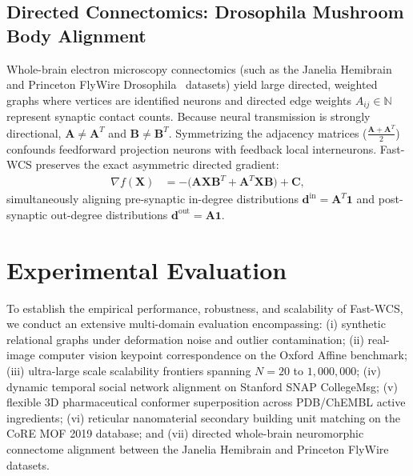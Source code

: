 \documentclass[a4paper,fleqn]{cas-dc}
\theoremstyle{thmstyleone}
\theoremstyle{thmstyletwo}
\theoremstyle{thmstylethree}
\begin{document}
\subsection{Directed Connectomics: Drosophila Mushroom Body Alignment}
Whole-brain electron microscopy connectomics (such as the Janelia Hemibrain~\cite{scheffer2020} and Princeton FlyWire Drosophila~\cite{dorkenwald2024} datasets) yield large directed, weighted graphs where vertices are identified neurons and directed edge weights $A_{ij} \in \mathbb{N}$ represent synaptic contact counts. Because neural transmission is strongly directional, $\mathbf{A} \ne \mathbf{A}^T$ and $\mathbf{B} \ne \mathbf{B}^T$. Symmetrizing the adjacency matrices ($\frac{\mathbf{A}+\mathbf{A}^T}{2}$) confounds feedforward projection neurons with feedback local interneurons. Fast-WCS preserves the exact asymmetric directed gradient:
\begin{align}
\nabla f(\mathbf{X}) &= -\big(\mathbf{A}\mathbf{X}\mathbf{B}^T + \mathbf{A}^T\mathbf{X}\mathbf{B}\big) + \mathbf{C},
\label{eq:asymm_grad}
\end{align}
simultaneously aligning pre-synaptic in-degree distributions $\mathbf{d}^{\text{in}} = \mathbf{A}^T \mathbf{1}$ and post-synaptic out-degree distributions $\mathbf{d}^{\text{out}} = \mathbf{A}\mathbf{1}$.

\section{Experimental Evaluation}
\label{sec:experiments}

To establish the empirical performance, robustness, and scalability of Fast-WCS, we conduct an extensive multi-domain evaluation encompassing: (i) synthetic relational graphs under deformation noise and outlier contamination; (ii) real-image computer vision keypoint correspondence on the Oxford Affine benchmark; (iii) ultra-large scale scalability frontiers spanning $N = 20$ to $1{,}000{,}000$; (iv) dynamic temporal social network alignment on Stanford SNAP CollegeMsg; (v) flexible 3D pharmaceutical conformer superposition across PDB/ChEMBL active ingredients; (vi) reticular nanomaterial secondary building unit matching on the CoRE MOF 2019 database; and (vii) directed whole-brain neuromorphic connectome alignment between the Janelia Hemibrain and Princeton FlyWire datasets.
\end{document}
